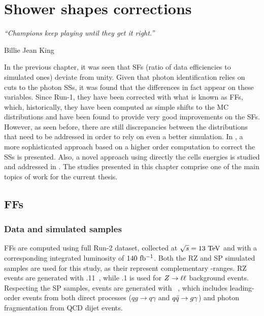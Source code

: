 \chapter{Shower shapes corrections}
\label{ch:ss_corrections}
\epigraph{\emph{“Champions keep playing until they get it right.”}}{Billie Jean King}


In the previous chapter, it was seen that \acp{SF} (ratio of data efficiencies to simulated ones) deviate from unity. Given that photon identification relies on cuts to the photon \acp{SS}, it was found that the differences in fact appear on these variables. Since Run-1, they have been corrected with what is known as \acfp{FF}, which, historically, they have been computed as simple shifts to the \ac{MC} distributions and have been found to provide very good improvements on the \acp{SF}. However, as seen before, there are still discrepancies between the distributions that need to be addressed in order to rely on even a better simulation.
In \Sect{\ref{sec:ss_corrections:ffs}}, a more sophisticated approach based on a higher order computation to correct the \acp{SS} is presented. Also, a novel approach using directly the cells energies is studied and addressed in \Sect{\ref{sec:ss_corrections:cell_rw}}. The studies presented in this chapter comprise one of the main topics of work for the current thesis.





\section{\acfp{FF}}
\label{sec:ss_corrections:ffs}


\subsection{Data and simulated samples}
\label{subsec:ss_corrections:ffs:samples}

\acp{FF} are computed using full Run-2 dataset, collected at \(\sqrt{s}=13~\tev\) and with a corresponding integrated luminosity of \(140~\ifb\).
Both the \ac{RZ} and \ac{SP} simulated samples are used for this study, as their represent complementary \pt-ranges. \ac{RZ} events are generated with .11~\cite{Sherpa2.2}, while .1 is used for \(\Zboson \to \ell\ell\) background events. Respecting the \ac{SP} samples, events are generated with ~\cite{Pythia8.1}, which includes leading-order \gammajet events from both direct processes (\(qg\to q\gamma\) and \(\qqbar \to g \gamma\)) and photon fragmentation from \ac{QCD} dijet events.

